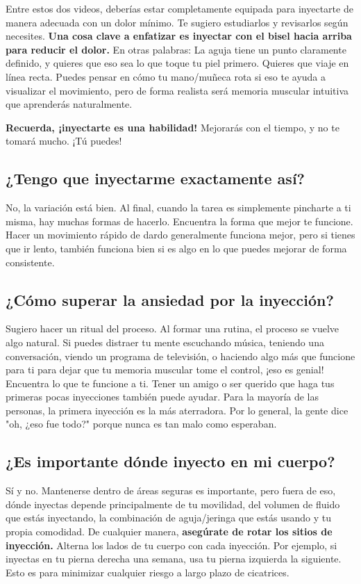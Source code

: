 \documentclass{article}
\begin{document}
Entre estos dos videos, deberías estar completamente equipada para inyectarte de manera adecuada con un dolor mínimo. Te sugiero estudiarlos y revisarlos según necesites. \textbf{Una cosa clave a enfatizar es inyectar con el bisel hacia arriba para reducir el dolor.} En otras palabras: La aguja tiene un punto claramente definido, y quieres que eso sea lo que toque tu piel primero. Quieres que viaje en línea recta. Puedes pensar en cómo tu mano/muñeca rota si eso te ayuda a visualizar el movimiento, pero de forma realista será memoria muscular intuitiva que aprenderás naturalmente.

\textbf{Recuerda, ¡inyectarte es una habilidad!} Mejorarás con el tiempo, y no te tomará mucho. ¡Tú puedes!

\subsection{¿Tengo que inyectarme exactamente así?}

No, la variación está bien. Al final, cuando la tarea es simplemente pincharte a ti misma, hay muchas formas de hacerlo. Encuentra la forma que mejor te funcione. Hacer un movimiento rápido de dardo generalmente funciona mejor, pero si tienes que ir lento, también funciona bien si es algo en lo que puedes mejorar de forma consistente.

\subsection{¿Cómo superar la ansiedad por la inyección?}

Sugiero hacer un ritual del proceso. Al formar una rutina, el proceso se vuelve algo natural. Si puedes distraer tu mente escuchando música, teniendo una conversación, viendo un programa de televisión, o haciendo algo más que funcione para ti para dejar que tu memoria muscular tome el control, ¡eso es genial! Encuentra lo que te funcione a ti. Tener un amigo o ser querido que haga tus primeras pocas inyecciones también puede ayudar. Para la mayoría de las personas, la primera inyección es la más aterradora. Por lo general, la gente dice "oh, ¿eso fue todo?" porque nunca es tan malo como esperaban.

\subsection{¿Es importante dónde inyecto en mi cuerpo?}

Sí y no. Mantenerse dentro de áreas seguras es importante, pero fuera de eso, dónde inyectas depende principalmente de tu movilidad, del volumen de fluido que estás inyectando, la combinación de aguja/jeringa que estás usando y tu propia comodidad. De cualquier manera, \textbf{asegúrate de rotar los sitios de inyección.} Alterna los lados de tu cuerpo con cada inyección. Por ejemplo, si inyectas en tu pierna derecha una semana, usa tu pierna izquierda la siguiente. Esto es para minimizar cualquier riesgo a largo plazo de cicatrices.
\end{document}

